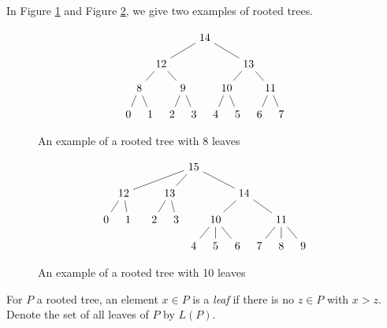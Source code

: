 \documentclass[smallextended]{svjour3}       %
\numberwithin{equation}{section}
\begin{document}
\begin{example}
In Figure \ref{fig:tree1} and Figure \ref{fig:tree2}, we give two examples of rooted trees.
\end{example}
\begin{figure}[h!]
\[\begin{tikzpicture}[scale=.7]
  \node (0) at (-4,0) {$0$};
  \node (1) at (-3,0) {$1$};
  \node (2) at (-2,0) {$2$};
  \node (3) at (-1,0) {$3$};
    \node (4) at (0,0) {$4$};
  \node (5) at (1,0) {$5$};
  \node (6) at (2,0) {$6$};
  \node (7) at (3,0) {$7$};
  \node (8) at (-3.5,1.2) {$8$};
  \node (9) at (-1.5,1.2) {$9$};
  \node (10) at (.5,1.2) {$10$};
  \node (11) at (2.5,1.2) {$11$};
    \node (12) at (-2.5,2.3) {$12$};
  \node (13) at (1.5,2.3) {$13$};
  \node (14) at (-.5,3.5) {$14$};
  \draw (0)--(8);
  \draw (1)--(8);
  \draw (2)--(9);
  \draw (3)--(9);
  \draw (4)--(10);
  \draw (5)--(10);
  \draw (6)--(11);
  \draw (7)--(11);
  \draw (8)--(12);
  \draw (9)--(12);
  \draw (10)--(13);
  \draw (11)--(13);
  \draw (12)--(14);
  \draw (13)--(14);
\end{tikzpicture}\]
\caption{\label{fig:tree1} An example of a rooted tree with $8$ leaves}
\end{figure}


\begin{figure}[h!]
\[\begin{tikzpicture}[scale=.7]
  \node (0) at (-4,0) {$0$};
  \node (1) at (-3,0) {$1$};
  \node (2) at (-1.8,0) {$2$};
  \node (3) at (-0.8,0) {$3$};
    \node (4) at (0,-1.2) {$4$};
  \node (5) at (1,-1.2) {$5$};
  \node (6) at (2,-1.2) {$6$};
  \node (7) at (3,-1.2) {$7$};
  \node (8) at (4,-1.2) {$8$};
  \node (9) at (5,-1.2) {$9$};
  \node (10) at (1, 0) {$10$};
  \node (11) at (4,0) {$11$};
    \node (12) at (-3.2,1.2) {$12$};
  \node (13) at (-1.1,1.2) {$13$};
  \node (14) at (2.3,1.2) {$14$};
  \node (15) at (0,2.4) {$15$};
 \draw (0)--(12);
  \draw (1)--(12);
  \draw (2)--(13);
  \draw (3)--(13);
  \draw (4)--(10);
  \draw (5)--(10);
  \draw (6)--(10);
  \draw (7)--(11);
  \draw (8)--(11);
  \draw (9)--(11);
  \draw (10)--(14);
  \draw (11)--(14);
  \draw (12)--(15);
  \draw (13)--(15);
  \draw (14)--(15);
\end{tikzpicture}\]
\caption{\label{fig:tree2} An example of a rooted tree with 10  leaves}
\end{figure}

\begin{definition}
For $P$ a rooted tree, an element $x \in P$ is a {\it leaf} if there is no $z \in P$ with $x > z$. Denote the set of all leaves of $P$ by $L(P)$.
\end{definition}
\end{document}
